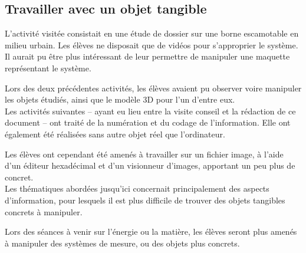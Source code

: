 \documentclass[pdftex,a4paper,12pt]{article}
\begin{document}
	\subsection{Travailler avec un objet tangible}
	L'activité visitée consistait en une étude de dossier sur une borne escamotable en milieu urbain.
	Les élèves ne disposait que de vidéos pour s'approprier le système. 
	Il aurait pu être plus intéressant de leur permettre de manipuler une maquette représentant le système.

	Lors des deux précédentes activités, les élèves avaient pu observer voire manipuler les objets étudiés, ainsi que le modèle 3D pour l'un d'entre eux.\\

	Les activités suivantes -- ayant eu lieu entre la visite conseil et la rédaction de ce document -- ont traité de la numération et du codage de l'information.
	Elle ont également été réalisées sans autre objet réel que l'ordinateur.
	
	Les élèves ont cependant été amenés à travailler sur un fichier image, à l'aide d'un éditeur hexadécimal et d'un visionneur d'images, 
	apportant un peu plus de concret.\\

	Les thématiques abordées jusqu'ici concernait principalement des aspects d'information, 
	pour lesquels il est plus difficile de trouver des objets tangibles concrets à manipuler. 
	
	Lors des séances à venir sur l'énergie ou la matière, les élèves seront plus amenés à manipuler des systèmes de mesure, ou des objets plus concrets.\\
\end{document}
